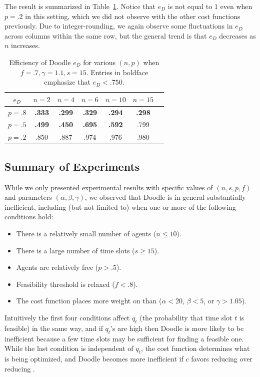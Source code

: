 The result is summarized in Table~\ref{bdoodle:table:DoodleEfficiency-lower-attendance_inconvenience_averse}. Notice that $e_{D}$ is not equal to $1$ even when $p = .2$ in this setting, which we did not observe with the other cost functions previously. Due to integer-rounding, we again observe some fluctuations in $e_{D}$ across columns within the same row, but the general trend is that $e_{D}$ decreases as $n$ increases.
\begin{table}[h]  %
\centering
\begin{tabular}{|c|c|c|c|c|c|c|}
	\hline
	$e_{D}$ & $n = 2$ & $n = 4$ & $n = 6$ & $ n = 10 $ & $n = 15$ \\ \hline
	$p = .8$ & \textbf{.333} & \textbf{.299} & \textbf{.329} & \textbf{.294} & \textbf{.298} \\ \hline
	$p = .5$ & \textbf{.499} & \textbf{.450} & \textbf{.695} & \textbf{.592} & .799  \\ \hline
	$p = .2$ & .850 & .887 & .974 & .976 & .980 \\ \hline	
\end{tabular}
\caption{Efficiency of Doodle $e_{D}$ for various $(n, p)$ when $f = .7, \gamma=1.1, s = 15$.
Entries in boldface emphasize that $e_{D} < .750$.
} \label{bdoodle:table:DoodleEfficiency-lower-attendance_inconvenience_averse}
\end{table}


\subsection{Summary of Experiments}
While we only presented experimental results with specific values of $(n, s, p, f)$ and parameters $(\alpha, \beta, \gamma)$, we observed that Doodle is in general substantially inefficient, including (but not limited to) when one or more of the following conditions hold:
\begin{itemize} 
	\item There is a relatively small number of agents ($n \leq 10$).
	\item There is a large number of time slots ($s \geq 15$).
	\item Agents are relatively free ($p > .5$).
	\item Feasibility threshold is relaxed ($f < .8$).
	\item The cost function places more weight on \Inconveniences than \Times ($\alpha < 20$, $\beta < 5$, or $\gamma > 1.05$).
\end{itemize}
Intuitively the first four conditions affect $q_t$ (the probability that time slot $t$ is feasible) in the same way, and if $q_t$'s are high then Doodle is more likely to be inefficient because a few time slots may be sufficient for finding a feasible one. While the last condition is independent of $q_t$, the cost function determines what is being optimized, and Doodle becomes more inefficient if $c$ favors reducing \Inconveniences over reducing \Time.




